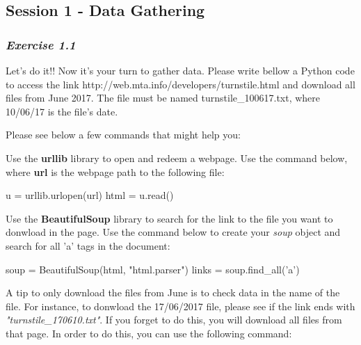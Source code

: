 \documentclass[11pt]{article}
\newenvironment{Shaded}{}{}
\newcommand{\StringTok}[1]{\textcolor[rgb]{0.25,0.44,0.63}{{#1}}}
\newcommand{\NormalTok}[1]{{#1}}
\newcommand{\OperatorTok}[1]{\textcolor[rgb]{0.40,0.40,0.40}{{#1}}}
\begin{document}
    \subsection{Session 1 - Data
Gathering}\label{session-1---data-gathering}

\subsubsection{\texorpdfstring{\emph{Exercise
1.1}}{Exercise 1.1}}\label{exercise-1.1}

Let's do it!! Now it's your turn to gather data. Please write bellow a
Python code to access the link
http://web.mta.info/developers/turnstile.html and download all files
from June 2017. The file must be named turnstile\_100617.txt, where
10/06/17 is the file's date.

Please see below a few commands that might help you:

Use the \textbf{urllib} library to open and redeem a webpage. Use the
command below, where \textbf{url} is the webpage path to the following
file:

\begin{Shaded}
\begin{Highlighting}[]
\NormalTok{u }\OperatorTok{=}\NormalTok{ urllib.urlopen(url)}
\NormalTok{html }\OperatorTok{=}\NormalTok{ u.read()}
\end{Highlighting}
\end{Shaded}

Use the \textbf{BeautifulSoup} library to search for the link to the
file you want to donwload in the page. Use the command below to create
your \emph{soup} object and search for all 'a' tags in the document:

\begin{Shaded}
\begin{Highlighting}[]
\NormalTok{soup }\OperatorTok{=}\NormalTok{ BeautifulSoup(html, }\StringTok{"html.parser"}\NormalTok{)}
\NormalTok{links }\OperatorTok{=}\NormalTok{ soup.find_all(}\StringTok{'a'}\NormalTok{)}
\end{Highlighting}
\end{Shaded}

A tip to only download the files from June is to check data in the name
of the file. For instance, to donwload the 17/06/2017 file, please see
if the link ends with \emph{"turnstile\_170610.txt"}. If you forget to
do this, you will download all files from that page. In order to do
this, you can use the following command:
\end{document}
